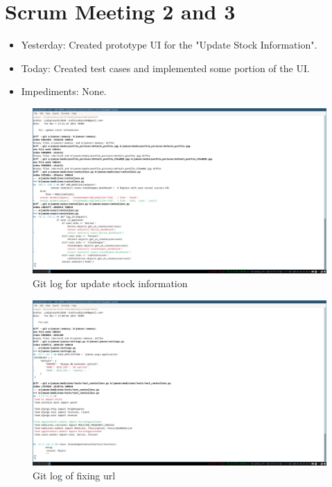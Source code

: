 \documentclass[a4paper,12pt]{article}
\begin{document}
\section{Scrum Meeting 2 and 3}
\begin{itemize}
    \item Yesterday: Created prototype UI for the "Update Stock Information".
    \item Today: Created test cases and implemented some portion of the UI.
    \item Impediments: None.
\end{itemize}
\begin{figure}[H]
    \centering
    \includegraphics[width=1\textwidth]{images/meet21.png}   
    \caption{Git log for update stock information}
    \label{fig:meet21}
\end{figure}
\begin{figure}[H]
    \centering
    \includegraphics[width=1\textwidth]{images/meet22.png}   
    \caption{Git log of fixing url}
    \label{fig:meet22}
\end{figure}
\end{document}
